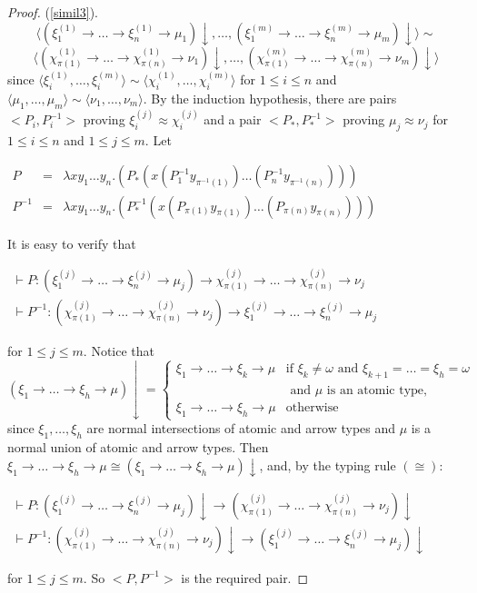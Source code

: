 \documentclass[UKenglish]{eptcs}
\newcommand{\dup}{\! : \!}
\newcommand{\tM}{\mu}
\newcommand{\tN}{\nu}
\newcommand{\te}{\xi}
\newcommand{\ti}{\chi}
\newcommand{\tu}{\omega}
\newcommand{\seq}[2]{\langle#1,\ldots,#2\rangle}
\newcommand{\tsi}{\sim}
\newcommand{\iso}{\approx}
\newcommand{\nf}[1]{#1\!\!\downarrow}
\newcommand{\myformula}[1]{\\[0.5pt]\centerline{#1}}
\newcommand{\esim}{\cong}
\begin{document}
\begin{proof}
(\ref{simil3}).
$$\seq{\nf{(\te^{(1)}_1 \to \ldots \to \te^{(1)}_n\to
\tM_1)}}{\nf{(\te^{(m)}_1 \to \ldots \to \te^{(m)}_n\to \tM_m)}}\tsi $$
\vspace{-5mm}
$$\seq{\nf{(\ti^{(1)}_{\pi(1)} \to \ldots \to \ti^{(1)}_{\pi(n)}\to
\tN_1)}}{\nf{(\ti^{(m)}_{\pi(1)} \to \ldots \to \ti^{(m)}_{\pi(n)}\to
\tN_m)}}$$
 since $\seq{\te^{(1)}_i}{\te^{(m)}_i} \tsi \seq{\ti^{(1)}_i}{\ti^{(m)}_i}$ for $1\leq i\leq n$ and $\seq{\tM_1}{\tM_m}\tsi\seq{\tN_1}{\tN_m}$.
 By the induction hypothesis, there are pairs $<P_i,P^{-1}_{i}\!\!>$ proving $\te_{i}^{(j)}\iso\ti_{i}^{(j)}$ and a pair $<P_*,P^{-1}_*\!\!>$ proving $\tM_j\iso\tN_j$ for $1\leq i\leq n$  and $1\leq j\leq m$. Let\\
  \centerline{$\begin{array}{lll}
P&=&\lambda x y_{1}\ldots y_{n}.(P_*(x  (P^{-1}_{1} y_{\pi^{-1}(1)})\ldots (P^{-1}_{n} y_{\pi^{-1}(n)})))\\
P^{-1}&=&
\lambda x y_{1}\ldots y_{n}. (P_*^{-1}(x (P_{\pi(1)} y_{\pi(1)})\ldots (P_{\pi(n)} y_{\pi(n)})))
\end{array}$}
 It is easy to verify that
  \myformula{$\begin{array}{c}
 \vdash P\dup (\te^{(j)}_1 \to \ldots \to \te^{(j)}_n\to
\tM_j)\to \ti^{(j)}_{\pi(1)} \to \ldots \to \ti^{(j)}_{\pi(n)}\to
\tN_j
\\
\vdash P^{-1}\dup
 (\ti^{(j)}_{\pi(1)} \to \ldots \to \ti^{(j)}_{\pi(n)}\to
\tN_j)\to
 \te^{(j)}_1 \to \ldots \to \te^{(j)}_n\to
\tM_j
 \end{array}$}
 for $1\leq j\leq m$. Notice that $\nf{(\te_1\to\ldots \to\te_h\to\tM)}=\begin{cases}
\te_1\to\ldots \to\te_k\to\tM      & \text{if } \te_{k}\not=\tu\text{ and }\te_{k+1}=\ldots=\te_h=\tu\\
&\text{ and } \tM \text{ is an atomic type}, \\
 \te_1\to\ldots \to\te_h\to\tM     & \text{otherwise}
\end{cases}$\\[3pt]
since $\te_1,\ldots ,\te_h$ are normal intersections of atomic and arrow types and $\tM$ is a normal union of atomic and arrow types. Then $\te_1\to\ldots \to\te_h\to\tM\esim\nf{(\te_1\to\ldots \to\te_h\to\tM)}$, and,
by the typing rule $(\esim)$:
 \myformula{$\begin{array}{c}
 \vdash P\dup \nf{(\te^{(j)}_1 \to \ldots \to \te^{(j)}_n\to
\tM_j)}\to \nf{(\ti^{(j)}_{\pi(1)} \to \ldots \to \ti^{(j)}_{\pi(n)}\to
\tN_j)}
\\
\vdash P^{-1}\dup
 \nf{(\ti^{(j)}_{\pi(1)} \to \ldots \to \ti^{(j)}_{\pi(n)}\to
\tN_j)}\to
 \nf{(\te^{(j)}_1 \to \ldots \to \te^{(j)}_n\to
\tM_j)}
 \end{array}$}
 for $1\leq j\leq m$.
 So $<P,P^{-1}>$ is the required pair.

\end{proof}
\end{document}
